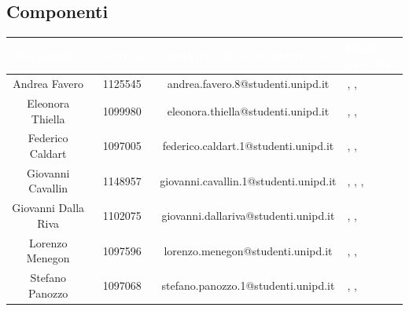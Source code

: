 \subsection{Componenti}
\begin{longtable}{| c | c | c | C{4cm} |}
	\hline
	\textcolor{white}{\textbf{Nominativo}} & \textcolor{white}{\textbf{Matricola}} & \textcolor{white}{\textbf{Indirizzo di posta elettronica}} & \textcolor{white}{\textbf{Ruoli previsti}}\\
	\hline
	Andrea Favero & 1125545 & andrea.favero.8@studenti.unipd.it & \adm, \ana, \ver \\
	\hline
	Eleonora Thiella & 1099980 & eleonora.thiella@studenti.unipd.it & \adm, \ana, \ver \\
	\hline
	Federico Caldart & 1097005 & federico.caldart.1@studenti.unipd.it & \adm, \ana, \ver\\
	\hline
	Giovanni Cavallin & 1148957 & giovanni.cavallin.1@studenti.unipd.it & \RdP, \adm, \ana, \ver\\
	\hline
	Giovanni Dalla Riva & 1102075 & giovanni.dallariva@studenti.unipd.it & \adm, \ana, \ver \\
	\hline
	Lorenzo Menegon & 1097596 & lorenzo.menegon@studenti.unipd.it & \adm, \ana, \ver \\
	\hline
	Stefano Panozzo & 1097068 & stefano.panozzo.1@studenti.unipd.it & \RdP, \ana, \ver\\
	\hline
\end{longtable}